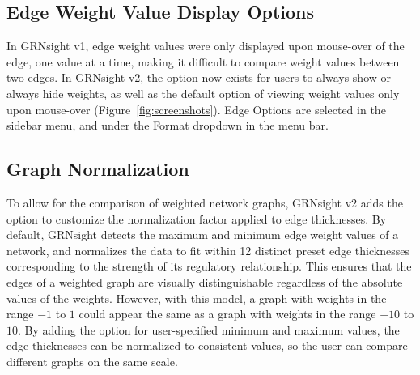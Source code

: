 \documentclass[sigconf,review]{acmart}
\begin{document}
\subsection{Edge Weight Value Display Options}
In GRNsight v1, edge weight values were only displayed upon mouse-over of the edge, one value at a time, making it difficult to compare weight values between two edges. In GRNsight v2, the option now exists for users to always show or always hide weights, as well as the default option of viewing weight values only upon mouse-over (Figure~\ref{fig:screenshots}). Edge Options are selected in the sidebar menu, and under the Format dropdown in the menu bar.

\subsection{Graph Normalization}

To allow for the comparison of weighted network graphs, GRNsight v2 adds the option to customize the normalization factor applied to edge thicknesses. By default, GRNsight detects the maximum and minimum edge weight values of a network, and normalizes the data to fit within 12 distinct preset edge thicknesses corresponding to the strength of its regulatory relationship. This ensures that the edges of a weighted graph are visually distinguishable regardless of the absolute values of the weights. However, with this model, a graph with weights in the range \(-1\) to \(1\) could appear the same as a graph with weights in the range \(-10\) to \(10\). By adding the option for user-specified minimum and maximum values, the edge thicknesses can be normalized to consistent values, so the user can compare different graphs on the same scale.
%
\end{document}

